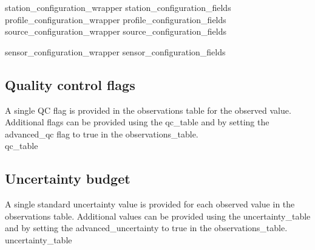 \documentclass[a4paper]{article}
\begin{document}



 {station_configuration_wrapper}
 {station_configuration_fields}
 {profile_configuration_wrapper}
 {profile_configuration_fields}
 {source_configuration_wrapper}
 {source_configuration_fields}

 {sensor_configuration_wrapper}
 {sensor_configuration_fields}

\subsection {Quality control flags}
A single QC flag is provided in the observations table for the observed value. Additional flags can be provided using the qc\_table and by setting the advanced\_qc flag to true in the observations\_table.\\
 {qc_table}

\subsection {Uncertainty budget}
A single standard uncertainty value is provided for each observed value in the observations table. Additional values can be provided using the uncertainty\_table and by setting the advanced\_uncertainty to true in the observations\_table.\\
 {uncertainty_table}

\end{document}

